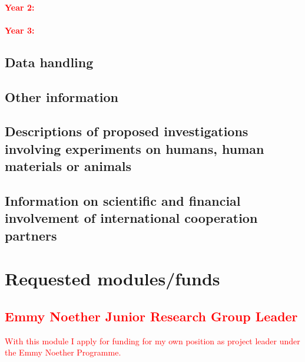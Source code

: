 \documentclass[a4paper,11pt,numbers=noenddot,parskip=half-]{scrreprt}
\begin{document}
\paragraph*{\textcolor{red}{Year 2:}}
\myblindtext
\paragraph*{\textcolor{red}{Year 3:}}
\myblindtext

\subsection{Data handling}
\myblindtext[2]

\subsection{Other information}
\myblindtext

\subsection{Descriptions of proposed investigations involving experiments on humans, human materials or animals}
\myblindtext

\subsection{Information on scientific and financial involvement of international cooperation partners}
\myblindtext

\renewcommand{\bibsection}{\section{Bibliography}}




\section{Requested modules/funds}
\subsection{\textcolor{red}{Emmy Noether Junior Research Group Leader}}
\textcolor{red}{With this module I apply for funding for my own position as project leader under
the Emmy Noether Programme.}
\end{document}
